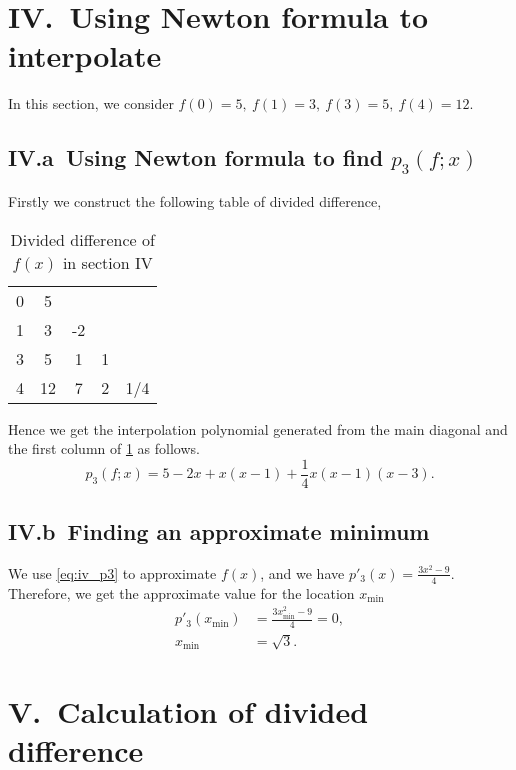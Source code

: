 \documentclass[a4paper]{article}
\renewcommand\arraystretch{1.8}
\begin{document}
\section*{IV.\ Using Newton formula to interpolate}

In this section, we consider $f(0) = 5,\ f(1) = 3,\ f(3) = 5,\ f(4) = 12$.

\subsection*{IV.a\ Using Newton formula to find $p_3(f; x)$}

Firstly we construct the following table of divided difference, 
\begin{table}[htbp]
  \centering
  \renewcommand{\arraystretch}{0.9}
  \begin{tabular}{c|cccc}
    0 & 5 & & & \\
    1 & 3 & -2 & & \\
    3 & 5 & 1 & 1 & \\
    4 & 12 & 7 & 2 & 1/4 \\
  \end{tabular}
  \caption{Divided difference of $f(x)$ in section IV}
  \label{tb:iv_div_diff}
  \renewcommand{\arraystretch}{1.0}
\end{table}

Hence we get the interpolation polynomial generated from the main diagonal and the first column of \cref{tb:iv_div_diff} as follows.
\begin{equation}
  p_3(f; x) = 5 - 2x + x(x - 1) + \frac{1}{4}x(x - 1)(x - 3).
  \label{eq:iv_p3}
\end{equation}

\subsection*{IV.b\ Finding an approximate minimum}

We use \cref{eq:iv_p3} to approximate $f(x)$, and we have $p'_3(x) = \frac{3x^2 - 9}{4}$. 
Therefore, we get the approximate value for the location $x_{\min}$
\begin{equation}
  \begin{aligned}
    p'_3(x_{\min}) &= \frac{3x_{\min}^2 - 9}{4} = 0, \\
    x_{\min} &= \sqrt{3}.
  \end{aligned}
\end{equation}

\section*{V.\ Calculation of divided difference}
\end{document}
